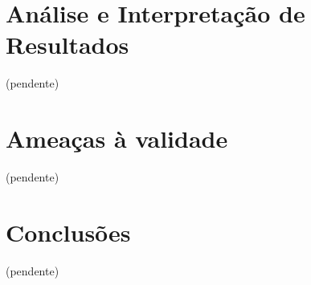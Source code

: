 \section{Análise e Interpretação de Resultados}

(pendente)

\section{Ameaças à validade}

(pendente)

\section{Conclusões}

(pendente)



